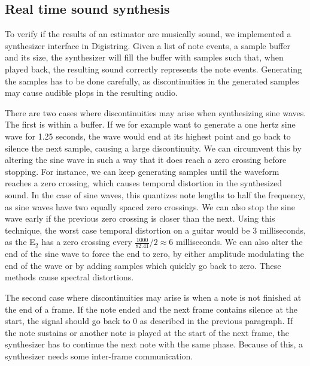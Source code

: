 \documentclass[a4paper,10pt,twocolumn]{article}
\newcommand{\note}[2]{#1${}_{#2}$}
\begin{document}
\subsection{Real time sound synthesis}  \label{sub:rtsynth}
To verify if the results of an estimator are musically sound, we implemented a synthesizer interface in Digistring. Given a list of note events, a sample buffer and its size, the synthesizer will fill the buffer with samples such that, when played back, the resulting sound correctly represents the note events. Generating the samples has to be done carefully, as discontinuities in the generated samples may cause audible plops in the resulting audio.%

There are two cases where discontinuities may arise when synthesizing sine waves. The first is within a buffer. If we for example want to generate a one hertz sine wave for 1.25 seconds, the wave would end at its highest point and go back to silence the next sample, causing a large discontinuity. We can circumvent this by altering the sine wave in such a way that it does reach a zero crossing before stopping. For instance, we can keep generating samples until the waveform reaches a zero crossing, which causes temporal distortion in the synthesized sound. In the case of sine waves, this quantizes note lengths to half the frequency, as sine waves have two equally spaced zero crossings. We can also stop the sine wave early if the previous zero crossing is closer than the next. Using this technique, the worst case temporal distortion on a guitar would be 3 milliseconds, as the \note{E}{2} has a zero crossing every $ \frac{1000}{82.41} / 2 \approx 6 $ milliseconds. We can also alter the end of the sine wave to force the end to zero, by either amplitude modulating the end of the wave or by adding samples which quickly go back to zero. These methods cause spectral distortions. %

The second case where discontinuities may arise is when a note is not finished at the end of a frame. If the note ended and the next frame contains silence at the start, the signal should go back to 0 as described in the previous paragraph. If the note sustains or another note is played at the start of the next frame, the synthesizer has to continue the next note with the same phase. Because of this, a synthesizer needs some inter-frame communication.
\end{document}
